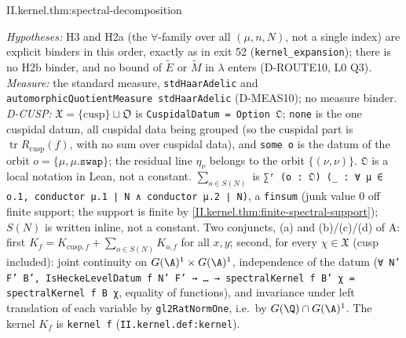 \begin{tfformal}{II.kernel.thm:spectral-decomposition}
\begin{tffidelity}
\emph{Hypotheses:} H3 and H2a (the $\forall$-family over all $(\mu,n,N)$, not a single index) are explicit binders in this order, exactly as in exit 52 (\texttt{kernel\_expansion}); there is no H2b binder, and no bound of $\widetilde E$ or $\widetilde M$ in $\lambda$ enters (D-ROUTE10, L0 Q3). \emph{Measure:} the standard measure, \texttt{stdHaarAdelic} and \texttt{automorphicQuotientMeasure stdHaarAdelic} (D-MEAS10); no measure binder. \emph{D-CUSP:} $\mathfrak X=\{\mathrm{cusp}\}\sqcup\mathfrak O$ is \texttt{CuspidalDatum = Option 𝔒}; \texttt{none} is the one cuspidal datum, all cuspidal data being grouped (so the cuspidal part is $\operatorname{tr}R_{\mathrm{cusp}}(f)$, with no sum over cuspidal data), and \texttt{some o} is the datum of the orbit $o=\{\mu,\mu.\texttt{swap}\}$; the residual line $\eta_\nu$ belongs to the orbit $\{(\nu,\nu)\}$. \texttt{𝔒} is a local notation in Lean, not a constant. $\sum_{o\in S(N)}$ is \texttt{∑ᶠ (o : 𝔒) (\_ : ∀ μ ∈ o.1, conductor μ.1 ∣ N ∧ conductor μ.2 ∣ N)}, a \texttt{finsum} (junk value $0$ off finite support; the support is finite by \cref{II.kernel.thm:finite-spectral-support}); $S(N)$ is written inline, not a constant. Two conjuncts, (a) and (b)/(c)/(d) of A: first $K_f=K_{\mathrm{cusp},f}+\sum_{o\in S(N)}K_{o,f}$ for all $x,y$; second, for every $\chi\in\mathfrak X$ (cusp included): joint continuity on $G(\A)^1\times G(\A)^1$, independence of the datum (\texttt{∀ N' F' B', IsHeckeLevelDatum f N' F' → … → spectralKernel f B' χ = spectralKernel f B χ}, equality of functions), and invariance under left translation of each variable by \texttt{gl2RatNormOne}, i.e.\ by $G(\Q)\cap G(\A)^1$. The kernel $K_f$ is \texttt{kernel f} (\texttt{II.kernel.def:kernel}).
\end{tffidelity}
\end{tfformal}
